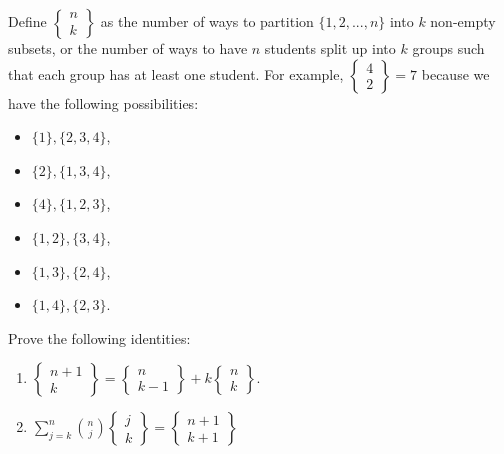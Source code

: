 \begin{exercise}{19}
    Define $\begin{Bmatrix} n\\ k\end{Bmatrix}$ as the number of ways to partition $\{1,2,...,n\}$ into $k$ non-empty subsets, or the number of ways to have $n$ students split up into $k$ groups such that each group has at least one student. For example, $\begin{Bmatrix} 4\\ 2\end{Bmatrix}=7$ because we have the following possibilities:
    \begin{itemize}
        \item $\{1\},\{2,3,4\}$,
        \item $\{2\},\{1,3,4\}$,
        \item $\{4\},\{1,2,3\}$,
        \item $\{1,2\},\{3,4\}$,
        \item $\{1,3\},\{2,4\}$,
        \item $\{1,4\},\{2,3\}$.
    \end{itemize}
    Prove the following identities:
    \begin{enumerate}
        \item $\begin{Bmatrix} n+1\\ k\end{Bmatrix}=\begin{Bmatrix} n\\ k-1\end{Bmatrix}+k\begin{Bmatrix} n\\ k\end{Bmatrix}$.
        \item $\sum_{j=k}^n \binom{n}{j}\begin{Bmatrix} j\\ k\end{Bmatrix} = \begin{Bmatrix} n+1\\ k+1\end{Bmatrix}$
    \end{enumerate}
\end{exercise}
